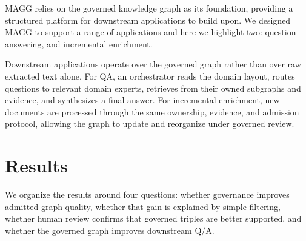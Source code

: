 \documentclass{article}
\newcommand{\system}{\textsc{MAGG}}
\begin{document}
\system{} relies on the governed knowledge graph as its foundation, providing a structured platform for downstream applications to build upon. We designed \system{} to support a range of applications and here we highlight two: question-answering, and incremental enrichment.

Downstream applications operate over the governed graph rather than over raw extracted text alone. For QA, an orchestrator reads the domain layout, routes questions to relevant domain experts, retrieves from their owned subgraphs and evidence, and synthesizes a final answer. For incremental enrichment, new documents are processed through the same ownership, evidence, and admission protocol, allowing the graph to update and reorganize under governed review.





\section{Results}
\label{sec:results}

We organize the results around four questions: whether governance improves admitted graph quality, 
whether that gain is explained by simple filtering, whether human review confirms that governed 
triples are better supported, and whether the governed graph improves downstream Q/A.
\end{document}
